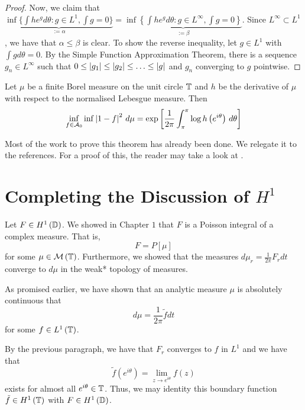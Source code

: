 \begin{proof}
    Now, we claim that $\underbrace{\inf \{ \int he^{g} d\theta : g \in L^{1}, \int g =0 \}}_{:=\alpha} = \underbrace{\inf \left\{ \int he^{g} d\theta : g \in L^{\infty} , \int g =0 \right\}}_{:=\beta}$. Since $L^{\infty} \subset L^{1}$, we have that $\alpha \le \beta$ is clear. To show the reverse inequality, let $g \in L^{1}$ with $\int g d\theta = 0$. By the Simple Function Approximation Theorem, there is a sequence $g_{n} \in L^{\infty}$ such that $0 \le \left\lvert g_1 \right\rvert \le \left\lvert g_2 \right\rvert \le \ldots \le \left\lvert g \right\rvert$ and $g_{n}$ converging to $g$ pointwise.

\end{proof}

\begin{theorem}
    Let $\mu$ be a finite Borel measure on the unit circle $\mathbb T$ and $h$ be the derivative of $\mu$ with respect to the normalised Lebesgue measure. Then
    \begin{equation*}
	\inf_{f\in {\cal A}_{0}} \inf \left\lvert 1-f \right\rvert^{2} \, d\mu = \exp  \left[ \frac{1}{2\pi} \int_{\pi}^{\pi} \log h\left( e^{i\theta} \right) \, d\theta \right]
    \end{equation*}
    \label{thm:szego-kolmogoroff-krein}
\end{theorem}
Most of the work to prove this theorem has already been done. We relegate it to the references. For a proof of this, the reader may take a look at \cite{hoffman2007banach}.

\section{Completing the Discussion of \texorpdfstring{$H^1$}{}}

Let $F\in H^{1} \left( \mathbb D \right)$. We showed in Chapter $1$ that $F$ is a Poisson integral of a complex measure. That is,
\begin{equation*}
    F=P\left[ \mu \right]
\end{equation*}
for some $\mu \in {\cal M} \left( \mathbb T \right)$. Furthermore, we showed that the measures
$d\mu_{r} = \frac{1}{2\pi} F_{r} dt$ converge to $d\mu$ in the weak* topology of measures.

As promised earlier, we have shown that an analytic measure $\mu$ is absolutely continuous that 
\begin{equation*}
    d\mu = \frac{1}{2\pi} \tilde{f} dt
\end{equation*}
for some $f\in L^{1} \left( \mathbb T \right)$.

By the previous paragraph, we have that $F_{r}$ converges to $f$ in $L^{1}$ and we have that 
\begin{equation*}
    \tilde{f} \left( e^{i\theta} \right) = \lim_{z\to e^{i\theta}} f\left( z \right)
\end{equation*}
exists for almost all $e^{i\theta} \in \mathbb T$. Thus, we may identity this boundary function $\tilde {f} \in H^{1} \left( \mathbb T \right)$ with $F\in H^{1} \left( \mathbb D \right)$.

